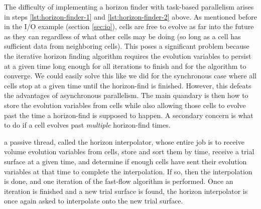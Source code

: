 \begin{bibunit}[unsrtnat]
The difficulty of implementing a horizon finder with task-based parallelism
arises in steps \ref{lst:horizon-finder-1} and \ref{lst:horizon-finder-2} above.
As mentioned before in the I/O example (section \ref{sec:io}), cells are free to
evolve as far into the future as they can regardless of what other cells may be
doing (so long as a cell has sufficient data from neighboring cells). This
poses a significant problem because the iterative horizon finding algorithm
requires the evolution variables to persist at a given time long
enough for all iterations to finish and for the algorithm to converge. We could
easily solve this like we did for the synchronous case where all cells stop at a
given time until the horizon-find is finished. However, this defeats
the advantages of asynchronous parallelism. The main quandary is then how to
store the evolution variables from cells while also allowing those cells to
evolve past the time a horizon-find is supposed to happen. A secondary concern
is what to do if a cell evolves past \textit{multiple} horizon-find times.

 a passive
thread, called the horizon interpolator, whose entire job is to receive volume
evolution variables from cells, store and sort them by time, receive a trial
surface at a given time, and determine if enough cells have sent their evolution
variables at that time to complete the interpolation. If so, then the
interpolation is done, and one iteration of the fast-flow algorithm is
performed. Once an iteration is finished and a new trial surface is found, the
horizon interpolator is once again asked to interpolate onto the new trial
surface.


\end{bibunit}
